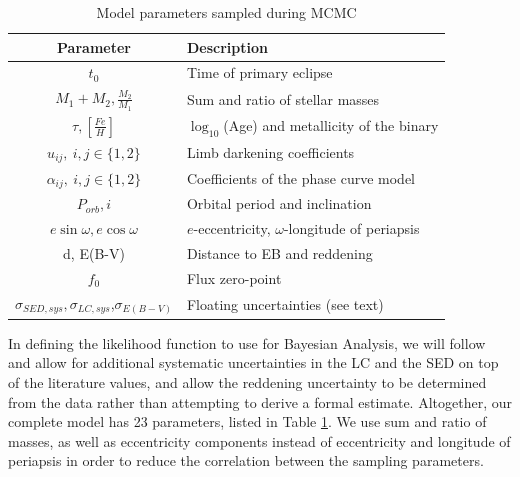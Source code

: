 \begin{table}
%
%
    \begin{tabular}{cl}
%
        \textbf{Parameter} & \textbf{Description}\\
%
        \toprule
%
        $t_0$ & Time of primary eclipse\\
%
        $M_1 + M_2, \frac{M_2}{M_1}$ & Sum and ratio of stellar masses\\
%
        $\tau, \left[\frac{Fe}{H}\right]$ & $\log_{10}$(Age) and metallicity of
        the binary\\
%
        $u_{ij},\ i,j\in\{1,2\}$ & Limb darkening coefficients\\
%
        $\alpha_{ij},\ i,j\in\{1,2\}$ & Coefficients of the phase curve model\\
%
        $P_{orb}, i$ & Orbital period and inclination\\
%
        $e\sin\omega, e\cos\omega$ & $e$-eccentricity, $\omega$-longitude of
        periapsis\\
%
        d, E(B-V) & Distance to EB and reddening\\
%
        $f_0$ & Flux zero-point\\
%
        $\sigma_{SED,sys}, \sigma_{LC,sys}$,$\sigma_{E(B-V)}$ &
        Floating uncertainties (see text)
%
    \end{tabular}
%
    \caption{Model parameters sampled during MCMC }
%
    \label{tab:mcmc_params}
%
\end{table}
%
In defining the likelihood function to use for Bayesian Analysis, we will follow
\citep{Windemuth_et_al_19} and allow for additional systematic uncertainties in
the LC and the SED on top of the literature values, and allow the reddening
uncertainty to be determined from the data rather than attempting to derive a
formal estimate. Altogether, our complete model has 23 parameters, listed in
Table \ref{tab:mcmc_params}. We use sum and ratio of masses, as well as
eccentricity components instead of eccentricity and longitude of periapsis in
order to reduce the correlation between the sampling parameters.

